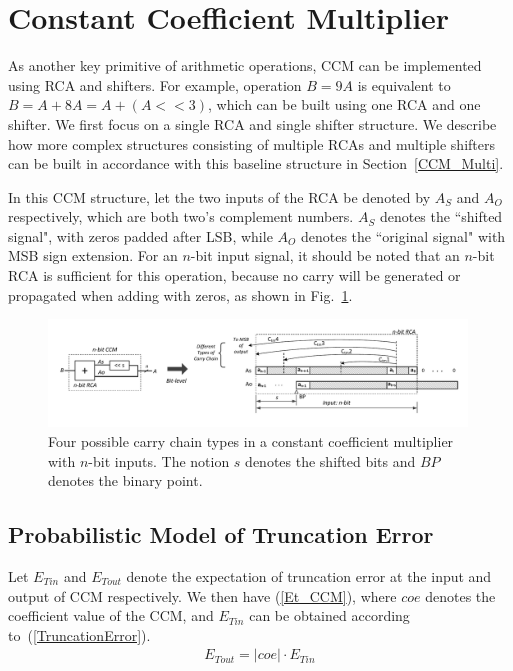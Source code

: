 \documentclass[journal]{IEEEtran}
\begin{document}

\section{Constant Coefficient Multiplier}\label{section_CCM}

As another key primitive of arithmetic operations, CCM can be implemented using RCA and shifters. For example, operation $B=9A$ is equivalent to $B=A+8A=A+(A<<3)$, which can be built using one RCA and one shifter. We first focus on a single RCA and single shifter structure. We describe how more complex structures consisting of multiple RCAs and multiple shifters can be built in accordance with this baseline structure in Section~\ref{CCM_Multi}.

In this CCM structure, let the two inputs of the RCA be denoted by $A_S$ and $A_O$ respectively, which are both two's complement numbers. $A_S$ denotes the ``shifted signal", with zeros padded after LSB, while $A_O$ denotes the ``original signal" with MSB sign extension. For an $n$-bit input signal, it should be noted that an $n$-bit RCA is sufficient for this operation, because no carry will be generated or propagated when adding with zeros, as shown in Fig.~\ref{CCM_fig}.
\begin{figure}[htbp]
  \centering
  \includegraphics[width=0.99\textwidth]{./Figures/CCM_CarryChain.pdf}
  \caption{Four possible carry chain types in a constant coefficient multiplier with $n$-bit inputs. The notion $s$ denotes the shifted bits and $BP$ denotes the binary point.}
  \label{CCM_fig}
\end{figure}

\subsection{Probabilistic Model of Truncation Error}
Let $E_{Tin}$ and $E_{Tout}$ denote the expectation of truncation error at the input and output of CCM respectively. We then have (\ref{Et_CCM}), where $coe$ denotes the coefficient value of the CCM, and $E_{Tin}$ can be obtained according to~(\ref{TruncationError}).
%
\begin{eqnarray}\label{Et_CCM}
  E_{Tout}=|coe|\cdot E_{Tin}
\end{eqnarray}
\end{document}
